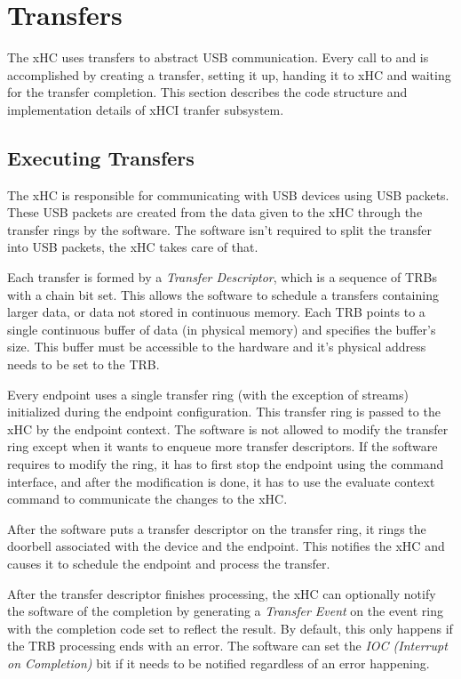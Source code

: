 \section{Transfers}
\label{sec:transfers}

The xHC uses transfers to abstract USB communication. Every call to
 and  is accomplished by creating a transfer,
setting it up, handing it to xHC and waiting for the transfer completion. This
section describes the code structure and implementation details of xHCI tranfer
subsystem.

\subsection{Executing Transfers}

The xHC is responsible for communicating with USB devices using USB packets.
These USB packets are created from the data given to the xHC through the
transfer rings by the software. The software isn't required to split the
transfer into USB packets, the xHC takes care of that.

Each transfer is formed by a \textit{Transfer Descriptor}, which is a sequence
of TRBs with a chain bit set. This allows the software to schedule a transfers
containing larger data, or data not stored in continuous memory. Each TRB
points to a single continuous buffer of data (in physical memory) and specifies
the buffer's size. This buffer must be accessible to the hardware and it's
physical address needs to be set to the TRB.

Every endpoint uses a single transfer ring (with the exception of streams)
initialized during the endpoint configuration. This transfer ring is passed to
the xHC by the endpoint context. The software is not allowed to modify the
transfer ring except when it wants to enqueue more transfer descriptors. If the
software requires to modify the ring, it has to first stop the endpoint using
the command interface, and after the modification is done, it has to use the
evaluate context command to communicate the changes to the xHC.

After the software puts a transfer descriptor on the transfer ring, it rings
the doorbell associated with the device and the endpoint. This notifies the xHC
and causes it to schedule the endpoint and process the transfer.

After the transfer descriptor finishes processing, the xHC can optionally
notify the software of the completion by generating a \textit{Transfer Event}
on the event ring with the completion code set to reflect the result. By
default, this only happens if the TRB processing ends with an error.
The software can set the \textit{IOC (Interrupt on Completion)} bit if it needs
to be notified regardless of an error happening.

